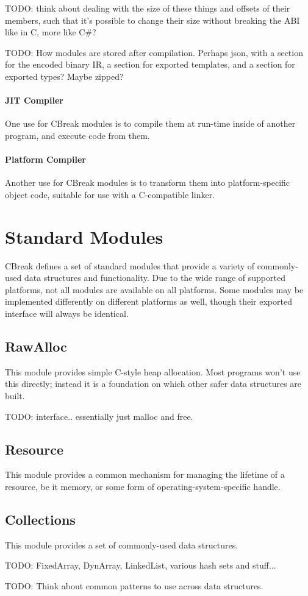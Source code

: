 \documentclass{article}
\newcommand{\breakingparagraph}[1]{\paragraph{#1}\mbox{}\medbreak}
\begin{document}
TODO: think about dealing with the size of these things and offsets of their members, such that it's possible to change their size without breaking the ABI like in C, more like C\#?

TODO: How modules are stored after compilation.  Perhaps json, with a section for the encoded binary IR, a section for exported templates, and a section for exported types?  Maybe zipped?

\breakingparagraph{JIT Compiler}

One use for CBreak modules is to compile them at run-time inside of another program, and execute code from them.

\breakingparagraph{Platform Compiler}

Another use for CBreak modules is to transform them into platform-specific object code, suitable for use with a C-compatible linker.

\newpage

\section{Standard Modules}

CBreak defines a set of standard modules that provide a variety of commonly-used data structures and functionality.  Due to the wide range of supported platforms, not all modules are available on all platforms.  Some modules may be implemented differently on different platforms as well, though their exported interface will always be identical.

\subsection{RawAlloc}

This module provides simple C-style heap allocation.  Most programs won't use this directly; instead it is a foundation on which other safer data structures are built.

TODO: interface.. essentially just malloc and free.

\subsection{Resource}

This module provides a common mechanism for managing the lifetime of a resource, be it memory, or some form of operating-system-specific handle.

\subsection{Collections}

This module provides a set of commonly-used data structures.

TODO: FixedArray, DynArray, LinkedList, various hash sets and stuff...

TODO: Think about common patterns to use across data structures.
\end{document}
